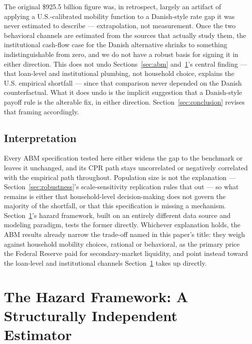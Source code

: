 \documentclass[12pt]{article}
\begin{document}
The original \$925.5 billion figure was, in retrospect, largely an artifact of applying a U.S.-calibrated mobility function to a Danish-style rate gap it was never estimated to describe --- extrapolation, not measurement. Once the two behavioral channels are estimated from the sources that actually study them, the institutional cash-flow case for the Danish alternative shrinks to something indistinguishable from zero, and we do not have a robust basis for signing it in either direction. This does not undo Sections~\ref{sec:abm} and~\ref{sec:hazard}'s central finding --- that loan-level and institutional plumbing, not household choice, explains the U.S. empirical shortfall --- since that comparison never depended on the Danish counterfactual. What it does undo is the implicit suggestion that a Danish-style payoff rule is the alterable fix, in either direction. Section~\ref{sec:conclusion} revises that framing accordingly.

\subsection{Interpretation}\label{sec:abm-interp}

Every ABM specification tested here either widens the gap to the benchmark or leaves it unchanged, and its CPR path stays uncorrelated or negatively correlated with the empirical path throughout. Population size is not the explanation --- Section~\ref{sec:robustness}'s scale-sensitivity replication rules that out --- so what remains is either that household-level decision-making does not govern the majority of the shortfall, or that this specification is missing a mechanism. Section~\ref{sec:hazard}'s hazard framework, built on an entirely different data source and modeling paradigm, tests the former directly. Whichever explanation holds, the ABM results already narrow the trade-off named in this paper's title: they weigh against household mobility choices, rational or behavioral, as the primary price the Federal Reserve paid for secondary-market liquidity, and point instead toward the loan-level and institutional channels Section~\ref{sec:hazard} takes up directly.

\section{The Hazard Framework: A Structurally Independent Estimator}\label{sec:hazard}
\end{document}
